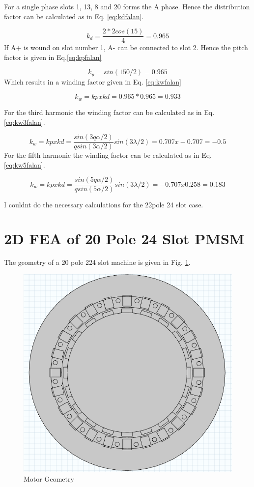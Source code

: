 \documentclass{article}
\begin{document}
For a single phase slots 1, 13, 8 and 20 forms the A phase. Hence the distribution factor can be calculated as in Eq. \ref{eq:kdfalan}.

\begin{equation}
	k_d=\frac{2*2cos(15)}{4}=0.965
	\label{eq:kdfalan}
\end{equation}
 If A+ is wound on slot number 1, A- can be connected to slot 2. Hence the pitch factor is given in Eq.\ref{eq:kpfalan}
 
 \begin{equation}
 k_p=sin(150/2)=0.965
 \label{eq:kpfalan}
 \end{equation}
  Which results in a winding factor given in Eq. \ref{eq:kwfalan}
  
   \begin{equation}
  k_w=kpxkd=0.965*0.965=0.933
  \label{eq:kwfalan}
  \end{equation}
  
 For the third harmonic the winding factor can be calculated as in Eq.\ref{eq:kw3falan}. 
 
    \begin{equation}
  k_w=kpxkd=\frac{sin(3q\alpha/2)}{qsin(3\alpha/2)}sin(3\lambda/2)=0.707x -0.707=-0.5
  \label{eq:kw3falan}
  \end{equation}
  For the fifth harmonic the winding factor can be calculated as in Eq. \ref{eq:kw5falan}.
  
  \begin{equation}
  k_w=kpxkd=\frac{sin(5q\alpha/2)}{qsin(5\alpha/2)}sin(3\lambda/2)=-0.707x 0.258=0.183 
  \label{eq:kw5falan}
  \end{equation}
  
  
  I couldnt do the necessary calculations for the 22pole 24 slot case. 
  
 \section{2D FEA of 20 Pole 24 Slot PMSM}
 
 The geometry of a 20 pole 224 slot machine is given in Fig. \ref{fig:feageom}.
 

\begin{figure}[H]
	\centering
	\includegraphics[width=0.7\linewidth]{Figurler/FEAgeom}
	\caption{Motor Geometry}
	\label{fig:feageom}
\end{figure}
\end{document}
